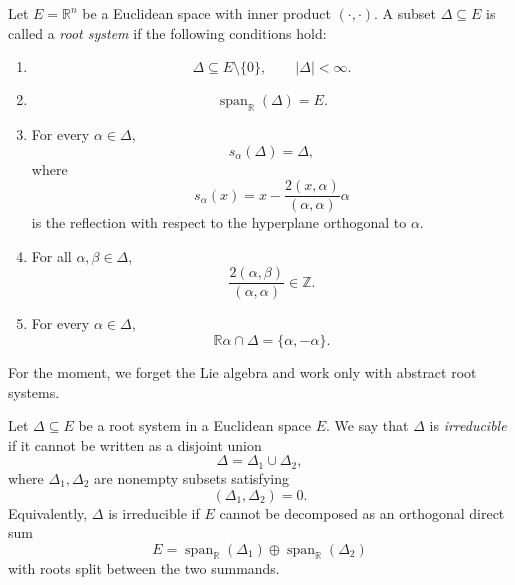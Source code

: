 \begin{definition}
    Let \(E=\mathbb{R}^n\) be a Euclidean space with inner product
    \((\cdot,\cdot)\). A subset \(\Delta\subseteq E\) is called a \emph{root system}
    if the following conditions hold:
    \begin{enumerate}
        \item
              \[
                  \Delta\subseteq E\setminus\{0\},
                  \qquad
                  |\Delta|<\infty.
              \]

        \item
              \[
                  \operatorname{span}_{\mathbb{R}}(\Delta)=E.
              \]

        \item
              For every \(\alpha\in\Delta\),
              \[
                  s_\alpha(\Delta)=\Delta,
              \]
              where
              \[
                  s_\alpha(x)
                  =
                  x-\frac{2(x,\alpha)}{(\alpha,\alpha)}\alpha
              \]
              is the reflection with respect to the hyperplane orthogonal to \(\alpha\).

        \item
              For all \(\alpha,\beta\in\Delta\),
              \[
                  \frac{2(\alpha,\beta)}{(\alpha,\alpha)}\in\mathbb{Z}.
              \]

        \item
              For every \(\alpha\in\Delta\),
              \[
                  \mathbb{R}\alpha\cap\Delta
                  =
                  \{\alpha,-\alpha\}.
              \]
    \end{enumerate}
\end{definition}

For the moment, we forget the Lie algebra and work only with abstract root
systems.

\begin{definition}
    Let \(\Delta\subseteq E\) be a root system in a Euclidean space \(E\). We say
    that \(\Delta\) is \emph{irreducible} if it cannot be written as a disjoint union
    \[
        \Delta=\Delta_1\cup\Delta_2,
    \]
    where \(\Delta_1,\Delta_2\) are nonempty subsets satisfying
    \[
        (\Delta_1,\Delta_2)=0.
    \]
    Equivalently, \(\Delta\) is irreducible if \(E\) cannot be decomposed as an
    orthogonal direct sum
    \[
        E=\operatorname{span}_{\mathbb{R}}(\Delta_1)
        \oplus
        \operatorname{span}_{\mathbb{R}}(\Delta_2)
    \]
    with roots split between the two summands.
\end{definition}

